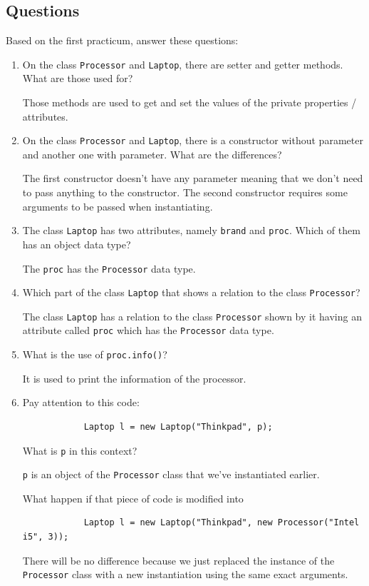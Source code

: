 \documentclass[12pt,titlepage]{article}
\begin{document}
\subsection{Questions}
Based on the first practicum, answer these questions:
\begin{enumerate}
    \item {
        On the class \texttt{Processor} and \texttt{Laptop}, there are setter and getter methods.
        What are those used for?

        Those methods are used to get and set the values of the private properties / attributes.
    }
    \item {
        On the class \texttt{Processor} and \texttt{Laptop}, there is a constructor without parameter
        and another one with parameter. What are the differences?

        The first constructor doesn't have any parameter meaning that we don't need to pass anything to the constructor.
        The second constructor requires some arguments to be passed when instantiating.
    }
    \item {
        The class \texttt{Laptop} has two attributes, namely \texttt{brand} and \texttt{proc}. Which of them
        has an object data type?

        The \texttt{proc} has the \texttt{Processor} data type.
    }
    \item {
        Which part of the class \texttt{Laptop} that shows a relation to the class \texttt{Processor}?

        The class \texttt{Laptop} has a relation to the class \texttt{Processor} shown by it having an attribute
        called \texttt{proc} which has the \texttt{Processor} data type.
    }
    \item {
        What is the use of \texttt{proc.info()}?

        It is used to print the information of the processor.
    }
    \item {
        Pay attention to this code:

        \begin{verbatim}
            Laptop l = new Laptop("Thinkpad", p);
        \end{verbatim}

        What is \texttt{p} in this context?

        \texttt{p} is an object of the \texttt{Processor} class that we've instantiated earlier.

        What happen if that piece of code is modified into

        \begin{verbatim}
            Laptop l = new Laptop("Thinkpad", new Processor("Intel i5", 3));
        \end{verbatim}

        There will be no difference because we just replaced the instance of the \\
        \texttt{Processor} class with a new instantiation using the same exact arguments.
    }
\end{enumerate}
\end{document}
